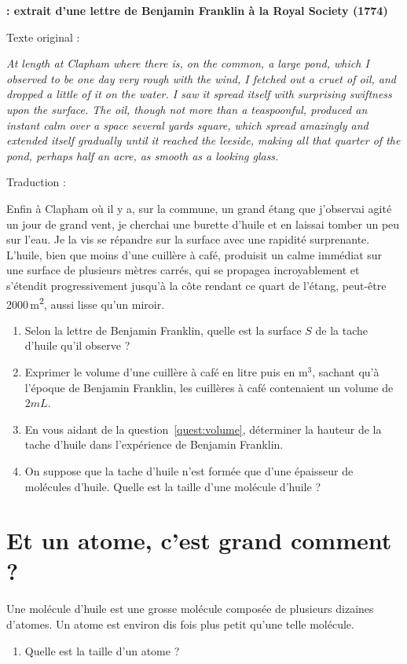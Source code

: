 \documentclass[12pt,a4paper]{article}
\begin{document}
\begin{doc}
\textbf{: extrait d'une lettre de Benjamin Franklin à la Royal Society (1774)}
\begin{multicols}{2}
\noindent
Texte original :

\textit{ \og
At length at Clapham where there is, on the common, a large pond, which I observed to be one day very rough with the wind, I fetched out a cruet of oil, and dropped a little of it on the water.
I saw it spread itself with surprising swiftness upon the surface.
The oil, though not more than a teaspoonful, produced an instant calm over a space several yards square, which spread amazingly and extended itself gradually until it reached the leeside, making all that quarter of the pond, perhaps half an acre, as smooth as a looking glass.
\fg{} }

\noindent
Traduction :

Enfin à Clapham où il y a, sur la commune, un grand étang que j'observai agité un jour de grand vent, je cherchai une burette d'huile et en laissai tomber un peu sur l'eau.
Je la vis se répandre sur la surface avec une rapidité surprenante.
L'huile, bien que moins d'une cuillère à café, produisit un calme immédiat sur une surface de plusieurs mètres carrés, qui se propagea incroyablement et s'étendit progressivement jusqu'à la côte rendant ce quart de l'étang, peut-être 2000\,m\textsuperscript{2}, aussi lisse qu'un miroir.
\end{multicols}
\end{doc}

\begin{enumerate}[resume]
\item Selon la lettre de Benjamin Franklin, quelle est la surface $S$ de la tache d'huile qu'il observe ?

\item Exprimer le volume d'une cuillère à café en litre puis en $\mathrm{m^3}$, sachant qu'à l'époque de Benjamin Franklin, les cuillères à café contenaient un volume de $\unit{2}{mL}$.

\item En vous aidant de la question~\ref{quest:volume}, déterminer la hauteur de la tache d'huile dans l'expérience de Benjamin Franklin.

\item On suppose que la tache d'huile n'est formée que d'une épaisseur de molécules d'huile.
Quelle est la taille d'une molécule d'huile ?
\end{enumerate}

\section*{Et un atome, c'est grand comment ?}

Une molécule d'huile est une grosse molécule composée de plusieurs dizaines d'atomes.
Un atome est environ dis fois plus petit qu'une telle molécule.
\begin{enumerate}[resume]
\item Quelle est la taille d'un atome ?
\end{enumerate}
\end{document}
